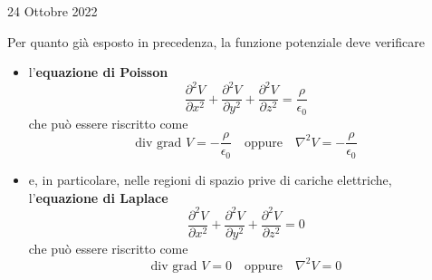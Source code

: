 \documentclass[a4paper]{extarticle}
\begin{document}
\newpage
\noindent
\begin{center}
  24 Ottobre 2022
\end{center}
Per quanto già esposto in precedenza, la funzione potenziale deve verificare
\begin{itemize}
  \item l'\textbf{equazione di Poisson}
  \[\frac{\partial^2 V}{\partial x^2} + \frac{\partial^2 V}{\partial y^2} + \frac{\partial^2 V}{\partial z^2} = \frac{\rho}{\epsilon_0}\]
  che può essere riscritto come
  \[\text{div grad } V = -\frac{\rho}{\epsilon_0} \hspace{1em} \text{oppure} \hspace{1em} \nabla^2 V = -\frac{\rho}{\epsilon_0}\]

  \item e, in particolare, nelle regioni di spazio prive di cariche elettriche, l'\textbf{equazione di Laplace}
  \[\frac{\partial^2 V}{\partial x^2} + \frac{\partial^2 V}{\partial y^2} + \frac{\partial^2 V}{\partial z^2} = 0\]
  che può essere riscritto come
  \[\text{div grad } V = 0 \hspace{1em} \text{oppure} \hspace{1em} \nabla^2 V = 0\]
\end{itemize}

\vspace{1em}
\end{document}

